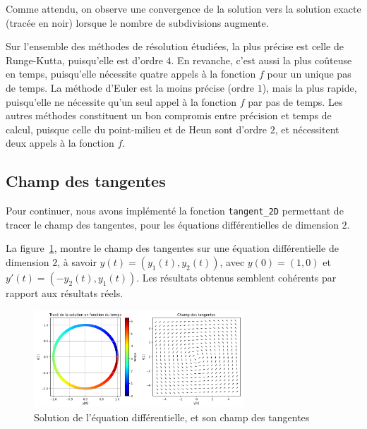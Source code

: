 Comme attendu, on observe une convergence de la solution vers la solution exacte (tracée en noir)
lorsque le nombre de subdivisions augmente.

Sur l'ensemble des méthodes de résolution étudiées, la plus précise est celle de Runge-Kutta, puisqu'elle est d'ordre $4$.
En revanche, c'est aussi la plus coûteuse en temps, puisqu'elle nécessite quatre appels à la fonction $f$ pour un unique pas de temps.
La méthode d'Euler est la moins précise (ordre $1$), mais la plus rapide, puisqu'elle ne nécessite qu'un seul appel à la fonction $f$ par pas de temps.
Les autres méthodes constituent un bon compromis entre précision et temps de calcul, puisque celle du point-milieu et de Heun sont d'ordre $2$, et nécessitent deux appels à la fonction $f$.

\subsection{Champ des tangentes}
Pour continuer, nous avons implémenté la fonction \texttt{tangent\_2D} permettant de tracer le champ des tangentes,
pour les équations différentielles de dimension $2$.

La figure~\ref{fig:tangente}, montre le champ des tangentes sur une équation différentielle
de dimension $2$, à savoir $y(t)=(y_1(t),y_2(t))$, avec $y(0)=(1,0)$ et $y'(t)=(-y_2(t),y_1(t))$.
Les résultats obtenus semblent cohérents par rapport aux résultats réels.

\begin{figure}[htbp!]
	\centering
	\includegraphics[width=0.7\textwidth]{res/tangente}
	\caption{Solution de l'équation différentielle, et son champ des tangentes}
	\label{fig:tangente}
\end{figure}

\vspace*{-0.7cm}
